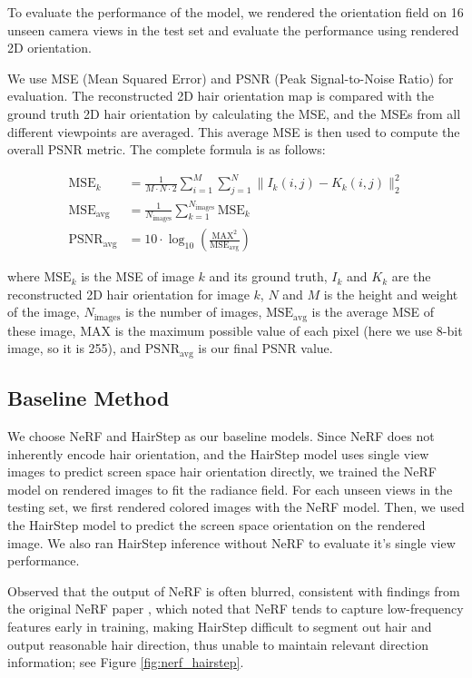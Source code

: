 \documentclass{article}
\begin{document}
To evaluate the performance of the model, we rendered the orientation field on 16 unseen camera views in the test set and evaluate the performance using rendered 2D orientation.

We use MSE (Mean Squared Error) and PSNR (Peak Signal-to-Noise Ratio) for evaluation. The reconstructed 2D hair orientation map is compared with the ground truth 2D hair orientation by calculating the MSE, and the MSEs from all different viewpoints are averaged. This average MSE is then used to compute the overall PSNR metric. The complete formula is as follows:

\begin{align}
    \text{MSE}_k &=
    \frac{1}{M \cdot N \cdot 2}
     \sum_{i=1}^M \sum_{j=1}^N \| I_k (i,j) - K_k(i,j)\|_2 ^2 \\
    \text{MSE}_\text{avg} &= \frac{1}{N_\text{images}} \sum_{k=1}^{N_\text{images}}\text{MSE}_k \\
    \text{PSNR}_\text{avg} &= 10 \cdot \log_{10} \left( \frac{\text{MAX}^2}{\text{MSE}_{\text{avg}}} \right)
\end{align}

where $\text{MSE}_k$ is the MSE of image $k$ and its ground truth, $I_k$ and $K_k$ are the reconstructed 2D hair orientation for image $k$, $N$ and $M$ is the height and weight of the image, $N_\text{images}$ is the number of images, $\text{MSE}_\text{avg}$ is the average MSE of these image, MAX is the maximum possible value of each pixel (here we use 8-bit image, so it is 255), and $\text{PSNR}_\text{avg}$ is our final PSNR value.

\subsection{Baseline Method}

We choose NeRF \cite{mildenhall_nerf_2020} and HairStep \cite{zheng_hairstep_2023} as our baseline models. Since NeRF does not inherently encode hair orientation, and the HairStep model uses single view images to predict screen space hair orientation directly, we trained the NeRF model on rendered images to fit the radiance field. For each unseen views in the testing set, we first rendered colored images with the NeRF model. Then, we used the HairStep model to predict the screen space orientation on the rendered image. We also ran HairStep inference without NeRF to evaluate it's single view performance.

Observed that the output of NeRF is often blurred, consistent with findings from the original NeRF paper \cite{mildenhall_nerf_2020}, which noted that NeRF tends to capture low-frequency features early in training, making HairStep difficult to segment out hair and output reasonable hair direction, thus unable to maintain relevant direction information; see Figure \ref{fig:nerf_hairstep}.
\end{document}
